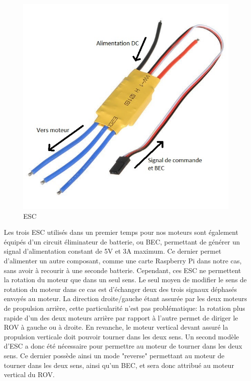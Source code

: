 \documentclass[a4paper,11pt]{report}
\begin{document}
			\begin{figure}[!h]
				\begin{center}
					\includegraphics[scale=1.8]{Photos/esc}
					\caption{ESC}
				\end{center}
			\end{figure}
			\newpage 
			Les trois ESC utilisés dans un premier temps pour nos moteurs \cite{ref6} sont également équipés d'un circuit éliminateur de batterie, ou BEC, permettant de générer un signal d'alimentation constant de 5V et 3A maximum. Ce dernier permet d'alimenter un autre composant, comme une carte Raspberry Pi dans notre cas, sans avoir à recourir à une seconde batterie. 
			\newline\newline Cependant, ces ESC ne permettent la rotation du moteur que dans un seul sens. Le seul moyen de modifier le sens de rotation du moteur dans ce cas est d'échanger deux des trois signaux déphasés envoyés au moteur. La direction droite/gauche étant assurée par les deux moteurs de propulsion arrière, cette particularité n'est pas problématique: la rotation plus rapide d'un des deux moteurs arrière par rapport à l'autre permet de diriger le ROV à gauche ou à droite. En revanche, le moteur vertical devant assuré la propulsion verticale doit pouvoir tourner dans les deux sens. Un second modèle d'ESC a donc été nécessaire pour permettre au moteur de tourner dans les deux sens. Ce dernier \cite{ref7} possède ainsi un mode "reverse" permettant au moteur de tourner dans les deux sens, ainsi qu'un BEC, et sera donc attribué au moteur vertical du ROV.
	
\end{document}

